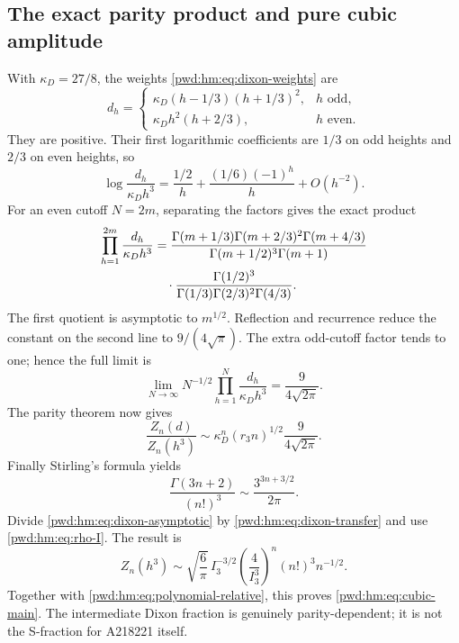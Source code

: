 \documentclass[11pt,letterpaper]{article}
\numberwithin{equation}{section}
\theoremstyle{remark}\newtheorem{remark}[theorem]{Remark}
\begin{document}
\subsection{The exact parity product and pure cubic amplitude}
With $\kappa_D=27/8$, the weights \eqref{pwd:hm:eq:dixon-weights} are
\[
 d_h=\begin{cases}
 \kappa_D(h-1/3)(h+1/3)^2,&h\text{ odd},\\
 \kappa_Dh^2(h+2/3),&h\text{ even}.
 \end{cases}
\]
They are positive. Their first logarithmic coefficients are $1/3$ on odd heights and $2/3$ on even heights, so
\begin{equation}\label{pwd:hm:eq:dixon-harmonic}
 \log\frac{d_h}{\kappa_Dh^3}
 =\frac{1/2}{h}+\frac{(1/6)(-1)^h}{h}+O(h^{-2}).
\end{equation}
For an even cutoff $N=2m$, separating the factors gives the exact product
\begin{align}\label{pwd:hm:eq:dixon-product}
 \prod_{h=1}^{2m}\frac{d_h}{\kappa_Dh^3}
 &=\frac{\Gamma(m+1/3)\Gamma(m+2/3)^2\Gamma(m+4/3)}
 {\Gamma(m+1/2)^3\Gamma(m+1)}\notag\\
 &\hspace{1em}\cdot\frac{\Gamma(1/2)^3}{\Gamma(1/3)\Gamma(2/3)^2\Gamma(4/3)}.
\end{align}
The first quotient is asymptotic to $m^{1/2}$. Reflection and recurrence reduce the constant on the second line to $9/(4\sqrt\pi)$. The extra odd-cutoff factor tends to one; hence the full limit is
\begin{equation}\label{pwd:hm:eq:dixon-product-limit}
 \lim_{N\to\infty}N^{-1/2}\prod_{h=1}^N\frac{d_h}{\kappa_Dh^3}
 =\frac9{4\sqrt{2\pi}}.
\end{equation}
The parity theorem now gives
\begin{equation}\label{pwd:hm:eq:dixon-transfer}
 \frac{Z_n(d)}{Z_n(h^3)}\sim
 \kappa_D^n(r_3n)^{1/2}\frac9{4\sqrt{2\pi}}.
\end{equation}
Finally Stirling's formula yields
\[
 \frac{\Gamma(3n+2)}{(n!)^3}\sim\frac{3^{3n+3/2}}{2\pi}.
\]
Divide \eqref{pwd:hm:eq:dixon-asymptotic} by \eqref{pwd:hm:eq:dixon-transfer} and use \eqref{pwd:hm:eq:rho-I}. The result is
\begin{equation}\label{pwd:hm:eq:pure-cubic}
 Z_n(h^3)\sim\sqrt{\frac6\pi}\,I_3^{-3/2}
 \left(\frac4{I_3^3}\right)^n(n!)^3n^{-1/2}.
\end{equation}
Together with \eqref{pwd:hm:eq:polynomial-relative}, this proves \eqref{pwd:hm:eq:cubic-main}. The intermediate Dixon fraction is genuinely parity-dependent; it is not the S-fraction for A218221 itself.
\end{document}
